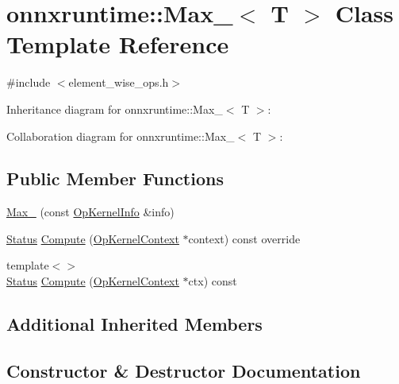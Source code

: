 \hypertarget{classonnxruntime_1_1Max__6}{}\section{onnxruntime\+:\+:Max\+\_$<$ T $>$ Class Template Reference}
\label{classonnxruntime_1_1Max__6}


{\ttfamily \#include $<$element\+\_\+wise\+\_\+ops.\+h$>$}



Inheritance diagram for onnxruntime\+:\+:Max\+\_$<$ T $>$\+:


Collaboration diagram for onnxruntime\+:\+:Max\+\_$<$ T $>$\+:
\subsection*{Public Member Functions}
\begin{DoxyCompactItemize}
\item 
\mbox{\hyperlink{classonnxruntime_1_1Max__6_aff06967f5f1ccb3848d92cf9f580c815}{Max\+\_}} (const \mbox{\hyperlink{classonnxruntime_1_1OpKernelInfo}{Op\+Kernel\+Info}} \&info)
\item 
\mbox{\hyperlink{classonnxruntime_1_1common_1_1Status}{Status}} \mbox{\hyperlink{classonnxruntime_1_1Max__6_a40f9a47a49395a3add4fea12385f448c}{Compute}} (\mbox{\hyperlink{classonnxruntime_1_1OpKernelContext}{Op\+Kernel\+Context}} $\ast$context) const override
\item 
{\footnotesize template$<$$>$ }\\\mbox{\hyperlink{classonnxruntime_1_1common_1_1Status}{Status}} \mbox{\hyperlink{classonnxruntime_1_1Max__6_a952abc27ee16328f3bfc831c3aa8e3db}{Compute}} (\mbox{\hyperlink{classonnxruntime_1_1OpKernelContext}{Op\+Kernel\+Context}} $\ast$ctx) const
\end{DoxyCompactItemize}
\subsection*{Additional Inherited Members}


\subsection{Constructor \& Destructor Documentation}
\mbox{\label{classonnxruntime_1_1Max__6_aff06967f5f1ccb3848d92cf9f580c815}} 
